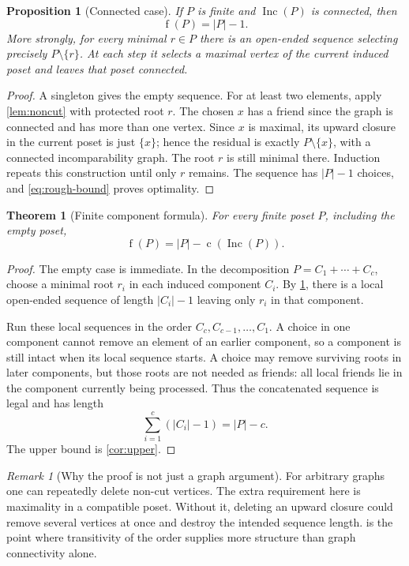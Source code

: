\documentclass[11pt,letterpaper]{article}
\newtheorem{theorem}{Theorem}[section]
\newtheorem{proposition}[proposition]{Proposition}
\theoremstyle{definition}
\theoremstyle{remark}
\newtheorem{remark}[remark]{Remark}
\newcommand{\fot}{\operatorname{f}}
\newcommand{\Inc}{\operatorname{Inc}}
\newcommand{\cc}{\operatorname{c}}
\begin{document}
\begin{proposition}[Connected case]\label{prop:connected}
If $P$ is finite and $\Inc(P)$ is connected, then
\[
 \fot(P)=|P|-1.
\]
More strongly, for every minimal $r\in P$ there is an open-ended sequence
selecting precisely $P\setminus\{r\}$. At each step it selects a maximal
vertex of the current induced poset and leaves that poset connected.
\end{proposition}
\begin{proof}
A singleton gives the empty sequence. For at least two elements, apply
\cref{lem:noncut} with protected root $r$. The chosen $x$ has a friend since
the graph is connected and has more than one vertex. Since $x$ is maximal,
its upward closure in the current poset is just $\{x\}$; hence the residual
is exactly $P\setminus\{x\}$, with a connected incomparability graph.
The root $r$ is still minimal there. Induction repeats this construction
until only $r$ remains. The sequence has $|P|-1$ choices, and
\eqref{eq:rough-bound} proves optimality.
\end{proof}

\begin{theorem}[Finite component formula]\label{thm:main}
For every finite poset $P$, including the empty poset,
\begin{equation}\label{eq:main}
 \boxed{\fot(P)=|P|-\cc(\Inc(P)).}
\end{equation}
\end{theorem}
\begin{proof}
The empty case is immediate. In the decomposition
$P=C_1+\cdots+C_c$, choose a minimal root $r_i$ in each induced component
$C_i$. By \cref{prop:connected}, there is a local open-ended sequence of
length $|C_i|-1$ leaving only $r_i$ in that component.

Run these local sequences in the order $C_c,C_{c-1},\ldots,C_1$.
A choice in one component cannot remove an element of an earlier component,
so a component is still intact when its local sequence starts. A choice may
remove surviving roots in later components, but those roots are not needed
as friends: all local friends lie in the component currently being processed.
Thus the concatenated sequence is legal and has length
\[
 \sum_{i=1}^c(|C_i|-1)=|P|-c.
\]
The upper bound is \cref{cor:upper}.
\end{proof}

\begin{remark}[Why the proof is not just a graph argument]
For arbitrary graphs one can repeatedly delete non-cut vertices. The extra
requirement here is maximality in a compatible poset. Without it, deleting
an upward closure could remove several vertices at once and destroy the
intended sequence length.  is the point where transitivity
of the order supplies more structure than graph connectivity alone.
\end{remark}
\end{document}
